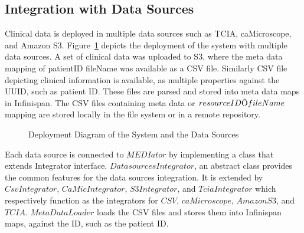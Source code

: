 \documentclass[letterpaper, 10 pt, conference]{ieeeconf}  %
\begin{document}
\subsection{Integration with Data Sources}
Clinical data is deployed in multiple data sources such as TCIA, caMicroscope, and Amazon S3. Figure~\ref{fig:dsdeployment} depicts the deployment of the system with multiple data sources. A set of clinical data was uploaded to S3, where the meta data mapping of patientID  fileName was available as a CSV file. Similarly CSV file depicting clinical information is available, as multiple properties against the UUID, such as patient ID. These files are parsed and stored into meta data maps in Infinispan. The CSV files containing meta data or $resource ID \ding{213} fileName$ mapping are stored locally in the file system or in a remote repository.
\begin{figure}[!htbp]
	\begin{center}
	\end{center}
	\vspace{-13pt}
	\caption{Deployment Diagram of the System and the Data Sources}
	\vspace{-13pt}
	\label{fig:dsdeployment}
\end{figure}

Each data source is connected to $MEDIator$ by implementing a class that extends Integrator interface. $DatasourcesIntegrator$, an abstract class provides the common features for the data sources integration. It is extended by $CsvIntegrator$, $CaMicIntegrator$, $S3Integrator$, and $TciaIntegrator$ which respectively function as the integrators for $CSV$, $caMicroscope$, $Amazon S3$, and $TCIA$. $MetaDataLoader$ loads the CSV files and stores them into Infinispan maps, against the ID, such as the patient ID. 
\end{document}
